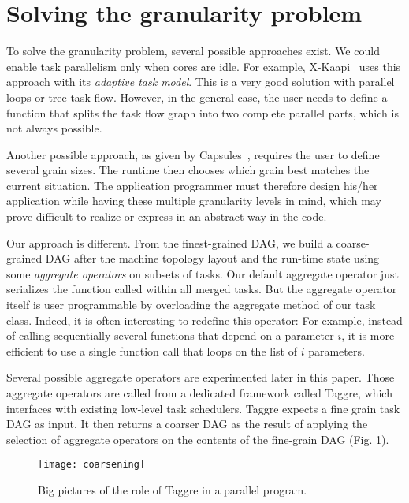 \section{Solving the granularity problem}

To solve the granularity problem, several possible approaches exist.
%
We could enable task parallelism only when cores are idle.
%
For example, X-Kaapi~\cite{xkaapi} uses this approach with its {\em adaptive task model}.
%
This is a very good solution with parallel loops or tree task flow.
%
However, in the general case, the user needs to define a function that splits the task flow graph into two complete parallel parts, which is not always possible.


Another possible approach, as given by Capsules~\cite{capsules}, requires the user to define several grain sizes.
%
The runtime then chooses which grain best matches the current situation.
%
The application programmer must therefore design his/her application while having these multiple granularity levels in mind, which may prove difficult to realize or express in an abstract way in the code.


Our approach is different.
%
From the finest-grained DAG, we build a coarse-grained DAG after the machine topology layout and the run-time state using some {\em aggregate operators} on subsets of tasks.
%
Our default aggregate operator just serializes the function called within all merged tasks.
%
But the aggregate operator itself is user programmable by overloading the aggregate method of our task class.
%
Indeed, it is often interesting to redefine this operator: For example, instead of calling sequentially several functions that depend on a parameter $i$, it is more efficient to use a single function call that loops on the list of $i$ parameters.


Several possible aggregate operators are experimented later in this paper.
%
Those aggregate operators are called from a dedicated framework called Taggre, which interfaces with existing low-level task
schedulers. 
%
Taggre expects a fine grain task DAG as input.
%
It then returns a coarser DAG as the result of applying the selection of aggregate operators on the contents of the fine-grain DAG (Fig. \ref{fig:taggre}).

\begin{figure}[!ht]
  \centering
  \texttt{[image: coarsening]}
  \caption{Big pictures of the role of Taggre in a parallel program.}
  \label{fig:taggre}
\end{figure}



